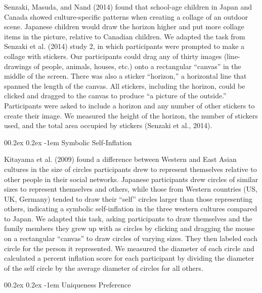 \documentclass[
  man,floatsintext]{apa6}
\makeatletter
\let\oldparagraph\paragraph
\renewcommand{\paragraph}[1]{\oldparagraph{#1}\mbox{}}
\renewcommand{\paragraph}{\@startsection{paragraph}{4}{\parindent}%
  {0\baselineskip \@plus 0.2ex \@minus 0.2ex}%
  {-1em}%
  {\normalfont\normalsize\bfseries\itshape\typesectitle}}
\makeatother
\begin{document}
Senzaki, Masuda, and Nand (2014) found that school-age children in Japan and Canada showed culture-specific patterns when creating a collage of an outdoor scene. Japanese children would draw the horizon higher and put more collage items in the picture, relative to Canadian children. We adapted the task from Senzaki et al. (2014) study 2, in which participants were prompted to make a collage with stickers. Our participants could drag any of thirty images (line-drawings of people, animals, houses, etc.) onto a rectangular ``canvas'' in the middle of the screen. There was also a sticker ``horizon,'' a horizontal line that spanned the length of the canvas. All stickers, including the horizon, could be clicked and dragged to the canvas to produce ``a picture of the outside.'' Participants were asked to include a horizon and any number of other stickers to create their image. We measured the height of the horizon, the number of stickers used, and the total area occupied by stickers (Senzaki et al., 2014).

\hypertarget{symbolic-self-inflation}{%
\paragraph{Symbolic Self-Inflation}\label{symbolic-self-inflation}}

Kitayama et al. (2009) found a difference between Western and East Asian cultures in the size of circles participants drew to represent themselves relative to other people in their social networks. Japanese participants drew circles of similar sizes to represent themselves and others, while those from Western countries (US, UK, Germany) tended to draw their ``self'' circles larger than those representing others, indicating a symbolic self-inflation in the three western cultures compared to Japan. We adapted this task, asking participants to draw themselves and the family members they grew up with as circles by clicking and dragging the mouse on a rectangular ``canvas'' to draw circles of varying sizes. They then labeled each circle for the person it represented. We measured the diameter of each circle and calculated a percent inflation score for each participant by dividing the diameter of the self circle by the average diameter of circles for all others.

\hypertarget{uniqueness-preference}{%
\paragraph{Uniqueness Preference}\label{uniqueness-preference}}
\end{document}
